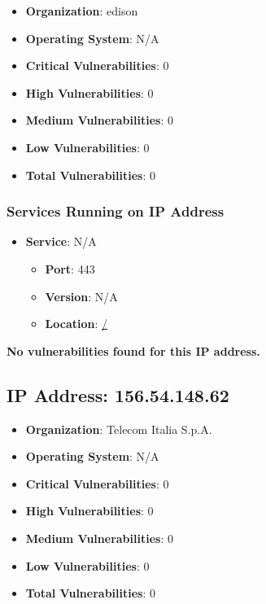 \documentclass{article}
\begin{document}
\begin{itemize}
    \item \textbf{Organization}: edison
    \item \textbf{Operating System}:  N/A 
    \item \textbf{Critical Vulnerabilities}: 0
    \item \textbf{High Vulnerabilities}: 0
    \item \textbf{Medium Vulnerabilities}: 0
    \item \textbf{Low Vulnerabilities}: 0
    \item \textbf{Total Vulnerabilities}: 0
\end{itemize}

\subsubsection*{Services Running on IP Address}

\begin{itemize}
    
        \item \textbf{Service}: N/A
        \begin{itemize}
            \item \textbf{Port}: 443
            \item \textbf{Version}:  N/A 
            \item \textbf{Location}: \href{ / }{ / }
        \end{itemize}
    
\end{itemize}


\textbf{No vulnerabilities found for this IP address.}




\clearpage



\subsection{IP Address: 156.54.148.62}

\begin{itemize}
    \item \textbf{Organization}: Telecom Italia S.p.A.
    \item \textbf{Operating System}:  N/A 
    \item \textbf{Critical Vulnerabilities}: 0
    \item \textbf{High Vulnerabilities}: 0
    \item \textbf{Medium Vulnerabilities}: 0
    \item \textbf{Low Vulnerabilities}: 0
    \item \textbf{Total Vulnerabilities}: 0
\end{itemize}
\end{document}
